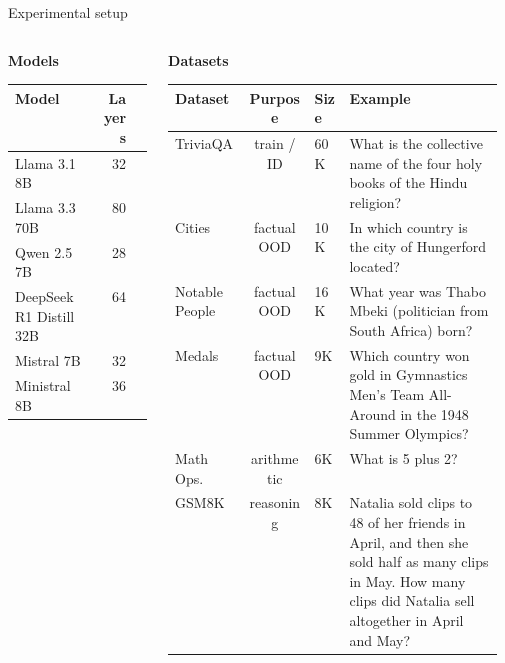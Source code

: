 \documentclass[final]{beamer}
\newlength{\maincolwidth}
\begin{document}
\begin{frame}[t]
\begin{columns}[t]
\begin{column}{\maincolwidth}
\begin{block}{Experimental setup}
\begin{columns}[t,totalwidth=\linewidth]
\begin{column}{0.32\linewidth}
\textbf{Models}\\[0.3ex]
\centering
\small
\begin{tabular}{@{}lrr@{}}
\toprule
Model & Layers \\
\midrule
Llama 3.1 8B & 32 \\
Llama 3.3 70B & 80 \\
Qwen 2.5 7B & 28 \\
DeepSeek R1 Distill 32B & 64 \\
Mistral 7B & 32 \\
Ministral 8B & 36 \\
\bottomrule
\end{tabular}
\end{column}
\begin{column}{0.64\linewidth}
\textbf{Datasets}\\[0.3ex]
\centering
\footnotesize
\begin{tabular}{@{}lclp{0.47\linewidth}@{}}
\toprule
Dataset & Purpose & Size & Example \\
\midrule
TriviaQA & train / ID & 60K & What is the collective name of the four holy books of the Hindu religion? \\
Cities & factual OOD & 10K & In which country is the city of Hungerford located? \\
Notable People & factual OOD & 16K & What year was Thabo Mbeki (politician from South Africa) born? \\
Medals & factual OOD & 9K & Which country won gold in Gymnastics Men's Team All-Around in the 1948 Summer Olympics? \\
Math Ops. & arithmetic & 6K & What is 5 plus 2? \\
GSM8K & reasoning & 8K & Natalia sold clips to 48 of her friends in April, and then she sold half as many clips in May. How many clips did Natalia sell altogether in April and May? \\
\bottomrule
\end{tabular}
\end{column}
\end{columns}


\end{block}
\end{column}
\end{columns}
\end{frame}
\end{document}
